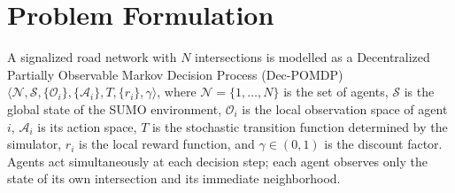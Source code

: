\section{Problem Formulation}
\label{sec:Methodology_ProblemFormulation}

A signalized road network with $N$ intersections is modelled as a Decentralized Partially Observable Markov Decision Process (Dec-POMDP) $\langle \mathcal{N}, \mathcal{S}, \{\mathcal{O}_i\}, \{\mathcal{A}_i\}, T, \{r_i\}, \gamma \rangle$, where $\mathcal{N} = \{1, \ldots, N\}$ is the set of agents, $\mathcal{S}$ is the global state of the SUMO environment, $\mathcal{O}_i$ is the local observation space of agent $i$, $\mathcal{A}_i$ is its action space, $T$ is the stochastic transition function determined by the simulator, $r_i$ is the local reward function, and $\gamma \in (0,1)$ is the discount factor. Agents act simultaneously at each decision step; each agent observes only the state of its own intersection and its immediate neighborhood.

